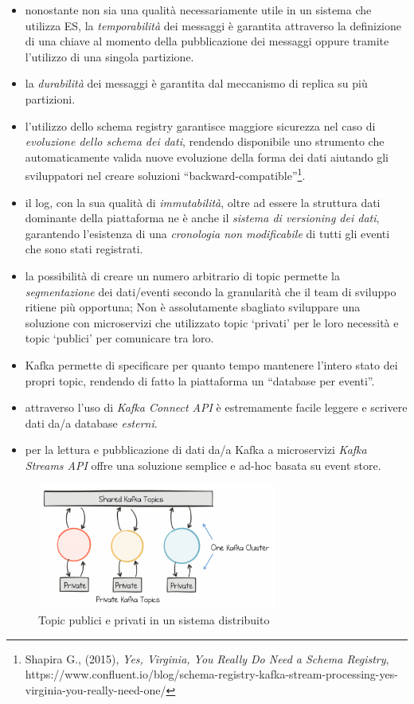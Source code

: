 \documentclass[]{article}
\providecommand{\tightlist}{%
  \setlength{\itemsep}{0pt}\setlength{\parskip}{0pt}}
\begin{document}
\begin{itemize}
\tightlist
\item
  nonostante non sia una qualità necessariamente utile in un sistema che
  utilizza ES, la \emph{temporabilità} dei messaggi è garantita
  attraverso la definizione di una chiave al momento della pubblicazione
  dei messaggi oppure tramite l'utilizzo di una singola partizione.
\item
  la \emph{durabilità} dei messaggi è garantita dal meccanismo di
  replica su più partizioni.
\item
  l'utilizzo dello schema registry garantisce maggiore sicurezza nel
  caso di \emph{evoluzione dello schema dei dati}, rendendo disponibile
  uno strumento che automaticamente valida nuove evoluzione della forma
  dei dati aiutando gli sviluppatori nel creare soluzioni
  ``backward-compatible''\footnote{Shapira G., (2015), \emph{Yes,
    Virginia, You Really Do Need a Schema Registry},
    https://www.confluent.io/blog/schema-registry-kafka-stream-processing-yes-virginia-you-really-need-one/}.
\item
  il log, con la sua qualità di \emph{immutabilità}, oltre ad essere la
  struttura dati dominante della piattaforma ne è anche il \emph{sistema
  di versioning dei dati}, garantendo l'esistenza di una
  \emph{cronologia non modificabile} di tutti gli eventi che sono stati
  registrati.
\item
  la possibilità di creare un numero arbitrario di topic permette la
  \emph{segmentazione} dei dati/eventi secondo la granularità che il
  team di sviluppo ritiene più opportuna; Non è assolutamente sbagliato
  sviluppare una soluzione con microservizi che utilizzato topic
  `privati' per le loro necessità e topic `publici' per comunicare tra
  loro.
\item
  Kafka permette di specificare per quanto tempo mantenere l'intero
  stato dei propri topic, rendendo di fatto la piattaforma un ``database
  per eventi''.
\item
  attraverso l'uso di \emph{Kafka Connect API} è estremamente facile
  leggere e scrivere dati da/a database \emph{esterni}.
\item
  per la lettura e pubblicazione di dati da/a Kafka a microservizi
  \emph{Kafka Streams API} offre una soluzione semplice e ad-hoc basata
  su event store.
\end{itemize}

\newpage

\begin{figure}
\centering
\includegraphics[width=0.70000\textwidth]{../images/public-private-topics.png}
\caption{Topic publici e privati in un sistema distribuito
\label{figure_5}}
\end{figure}
\end{document}
